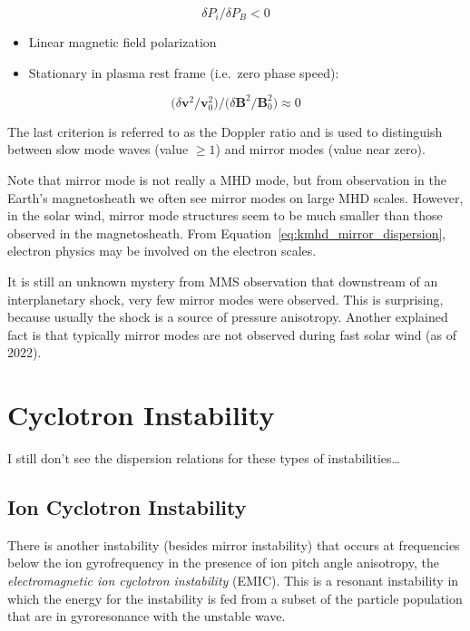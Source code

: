 \documentclass[
  notoc %
]{tufte-book}
\begin{document}
\[
\delta P_i / \delta P_B < 0
\]

\begin{itemize}
\item
  Linear magnetic field polarization
\item
  Stationary in plasma rest frame (i.e.~zero phase speed):
\end{itemize}

\[
\Big(\delta \mathbf{v}^2 / \mathbf{v}_0^2 \Big) / \Big( \delta \mathbf{B}^2 / \mathbf{B}_0^2 \Big) \approx 0
\]

The last criterion is referred to as the Doppler ratio and is used to
distinguish between slow mode waves (value \(\ge 1\)) and mirror modes
(value near zero).

Note that mirror mode is not really a MHD mode, but from observation in
the Earth's magnetosheath we often see mirror modes on large MHD scales.
However, in the solar wind, mirror mode structures seem to be much
smaller than those observed in the magnetosheath. From
Equation~\ref{eq:kmhd_mirror_dispersion}, electron physics may be
involved on the electron scales.

It is still an unknown mystery from MMS observation that downstream of
an interplanetary shock, very few mirror modes were observed. This is
surprising, because usually the shock is a source of pressure
anisotropy. Another explained fact is that typically mirror modes are
not observed during fast solar wind (as of 2022).

\hypertarget{cyclotron-instability}{%
\section{Cyclotron Instability}\label{cyclotron-instability}}

I still don't see the dispersion relations for these types of
instabilities\ldots{}

\hypertarget{ion-cyclotron-instability}{%
\subsection{Ion Cyclotron Instability}\label{ion-cyclotron-instability}}

There is another instability (besides mirror instability) that occurs at
frequencies below the ion gyrofrequency in the presence of ion pitch
angle anisotropy, the \emph{electromagnetic ion cyclotron instability}
(EMIC). This is a resonant instability in which the energy for the
instability is fed from a subset of the particle population that are in
gyroresonance with the unstable wave.
\end{document}
